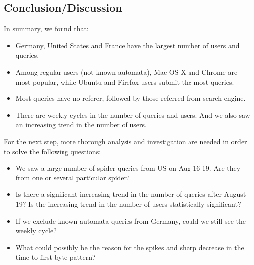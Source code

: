 \documentclass[12pt,]{article}
\providecommand{\tightlist}{%
  \setlength{\itemsep}{0pt}\setlength{\parskip}{0pt}}
\begin{document}
\subsection{Conclusion/Discussion}\label{conclusiondiscussion}

In summary, we found that:

\begin{itemize}
\tightlist
\item
  Germany, United States and France have the largest number of users and
  queries.
\item
  Among regular users (not known automata), Mac OS X and Chrome are most
  popular, while Ubuntu and Firefox users submit the most queries.
\item
  Most queries have no referer, followed by those referred from search
  engine.
\item
  There are weekly cycles in the number of queries and users. And we
  also saw an increasing trend in the number of users.
\end{itemize}

For the next step, more thorough analysis and investigation are needed
in order to solve the following questions:

\begin{itemize}
\tightlist
\item
  We saw a large number of spider queries from US on Aug 16-19. Are they
  from one or several particular spider?
\item
  Is there a significant increasing trend in the number of queries after
  August 19? Is the increasing trend in the number of users
  statistically significant?
\item
  If we exclude known automata queries from Germany, could we still see
  the weekly cycle?
\item
  What could possibly be the reason for the spikes and sharp decrease in
  the time to first byte pattern?
\end{itemize}
\end{document}

